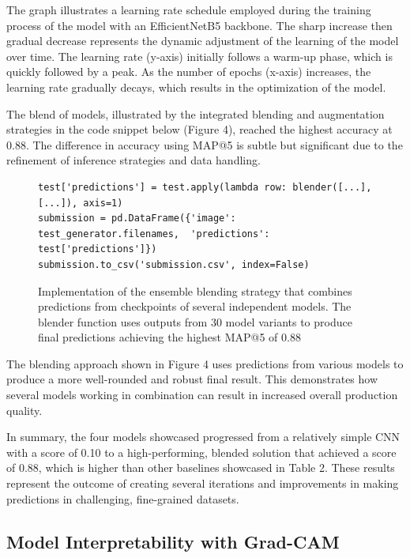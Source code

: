 \documentclass[twocolumn]{article}
\begin{document}
The graph illustrates a learning rate schedule employed during the training process of the model with an EfficientNetB5 backbone. The sharp increase then gradual decrease represents the dynamic adjustment of the learning of the model over time. The learning rate (y-axis) initially follows a warm-up phase, which is quickly followed by a peak. As the number of epochs (x-axis) increases, the learning rate gradually decays, which results in the optimization of the model. 

The blend of models, illustrated by the integrated blending and augmentation strategies in the code snippet below (Figure 4), reached the highest accuracy at 0.88. The difference in accuracy using MAP@5 is subtle but significant due to the refinement of inference strategies and data handling.

\begin{figure}[h!]
\centering
\begin{minipage}{0.99\linewidth}
\begin{lstlisting}
test['predictions'] = test.apply(lambda row: blender([...], [...]), axis=1)
submission = pd.DataFrame({'image': test_generator.filenames,  'predictions': test['predictions']})
submission.to_csv('submission.csv', index=False)
\end{lstlisting}
\end{minipage}
\caption{Implementation of the ensemble blending strategy that combines predictions from checkpoints of several independent models. The blender function uses outputs from 30 model variants to produce final predictions achieving the highest MAP@5 of 0.88}
\end{figure}

The blending approach shown in Figure 4 uses predictions from various models to produce a more well-rounded and robust final result. This demonstrates how several models working in combination can result in increased overall production quality.

In summary, the four models showcased progressed from a relatively simple CNN with a score of 0.10 to a high-performing, blended solution that achieved a score of 0.88, which is higher than other baselines showcased in Table 2. These results represent the outcome of creating several iterations and improvements in making predictions in challenging, fine-grained datasets.

\subsection{Model Interpretability with Grad-CAM}
\end{document}
